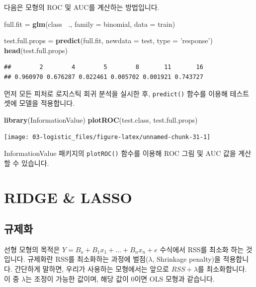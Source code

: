 \documentclass[12pt,]{book}
\newenvironment{Shaded}{\begin{snugshade}}{\end{snugshade}}
\newcommand{\DataTypeTok}[1]{\textcolor[rgb]{0.13,0.29,0.53}{#1}}
\newcommand{\KeywordTok}[1]{\textcolor[rgb]{0.13,0.29,0.53}{\textbf{#1}}}
\newcommand{\NormalTok}[1]{#1}
\newcommand{\OperatorTok}[1]{\textcolor[rgb]{0.81,0.36,0.00}{\textbf{#1}}}
\newcommand{\StringTok}[1]{\textcolor[rgb]{0.31,0.60,0.02}{#1}}
\begin{document}
다음은 모형의 ROC 및 AUC를 계산하는 방법입니다.

\begin{Shaded}
\begin{Highlighting}[]
\NormalTok{full.fit =}\StringTok{ }\KeywordTok{glm}\NormalTok{(class }\OperatorTok{~}\NormalTok{.,  }\DataTypeTok{family =}\NormalTok{ binomial, }\DataTypeTok{data =}\NormalTok{ train)}

\NormalTok{test.full.props =}\StringTok{ }\KeywordTok{predict}\NormalTok{(full.fit, }\DataTypeTok{newdata =}\NormalTok{ test, }\DataTypeTok{type =} \StringTok{'response'}\NormalTok{)}
\KeywordTok{head}\NormalTok{(test.full.props)}
\end{Highlighting}
\end{Shaded}

\begin{verbatim}
##        2        4        5        8       11       16 
## 0.960970 0.676287 0.022461 0.005702 0.001921 0.743727
\end{verbatim}

먼저 모든 피처로 로지스틱 회귀 분석을 실시한 후, \texttt{predict()} 함수를 이용해 테스트 셋에 모델을 적용합니다.

\begin{Shaded}
\begin{Highlighting}[]
\KeywordTok{library}\NormalTok{(InformationValue)}
\KeywordTok{plotROC}\NormalTok{(test.class, test.full.props)}
\end{Highlighting}
\end{Shaded}

\begin{center}\texttt{[image: 03-logistic\_files/figure-latex/unnamed-chunk-31-1]} \end{center}

InformationValue 패키지의 \texttt{plotROC()} 함수를 이용해 ROC 그림 및 AUC 값을 계산할 수 있습니다.

\hypertarget{ridge-lasso}{%
\chapter{RIDGE \& LASSO}\label{ridge-lasso}}

\hypertarget{uxaddcuxc81cuxd654}{%
\section{규제화}\label{uxaddcuxc81cuxd654}}

선형 모형의 목적은 \(Y = B_o + B_1x_1 + \dots + B_nx_n + e\) 수식에서 RSS를 최소화 하는 것입니다. 규제화란 RSS를 최소화하는 과정에 벌점(\(\lambda\), Shrinkage penalty)을 적용합니다. 간단하게 말하면, 우리가 사용하는 모형에서는 앞으로 \(RSS + \lambda\)를 최소화합니다. 이 중 \(\lambda\)는 조정이 가능한 값이며, 해당 값이 0이면 OLS 모형과 같습니다.
\end{document}
